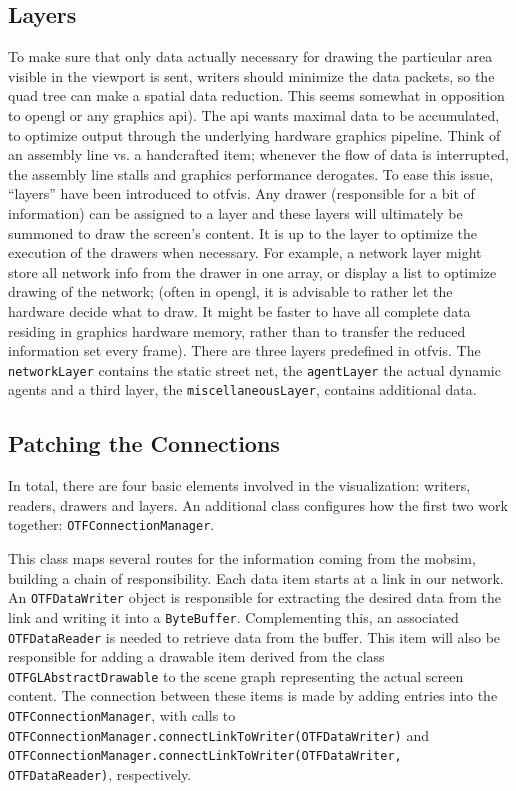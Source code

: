 \subsection{Layers}
To make sure that only data actually necessary for drawing the particular area visible in the viewport is sent, writers should minimize the data packets, so the quad tree can make a spatial data reduction. This seems somewhat in opposition to \gls{opengl} or any graphics \gls{api}). The \gls{api} wants maximal data to be accumulated, to optimize output through the underlying hardware graphics pipeline. 
Think of an assembly line vs. a handcrafted item; whenever the flow of data is interrupted, the assembly line stalls and graphics performance derogates. 
To ease this issue, ``layers'' have been introduced to \gls{otfvis}. 
Any drawer (responsible for a bit of information) can be assigned to a layer and 
these layers will ultimately be summoned to draw the screen's content. 
It is up to the layer to optimize the execution of the drawers when necessary. 
For example, a network layer might store all network info from the drawer in one array, or display a list to optimize drawing of the network; (often in \gls{opengl}, it is advisable to rather let the hardware decide what to draw. 
It might be faster to have all complete data residing in graphics hardware memory, rather than to transfer the reduced information set every frame). There are three layers predefined in \gls{otfvis}. 
The \lstinline|networkLayer| contains the static street net, the \lstinline|agentLayer| the actual dynamic agents and a third layer, the \lstinline|miscellaneousLayer|,  contains additional data.

\subsection{Patching the Connections}
In total, there are four basic elements involved in the visualization: writers, readers, drawers and layers. 
An additional class configures how the first two work together: \lstinline|OTFConnectionManager|.

This class maps several routes for the information coming from the \gls{mobsim}, building a chain of responsibility. 
Each data item starts at a link in our network. 
An \lstinline|OTFDataWriter| object is responsible for extracting the desired data from the link and writing it into a \lstinline|ByteBuffer|. 
Complementing this, an associated \lstinline|OTFDataReader| is needed to retrieve data from the buffer. 
This item will also be responsible for adding a drawable item derived from the class \lstinline|OTFGLAbstractDrawable| to the scene graph representing the actual screen content. 
The connection between these items is made by adding entries into the \lstinline|OTFConnectionManager|, with calls to \lstinline|OTFConnectionManager.connectLinkToWriter(OTFDataWriter)| 
and \lstinline|OTFConnectionManager.connectLinkToWriter(OTFDataWriter, OTFDataReader)|, respectively.
 
